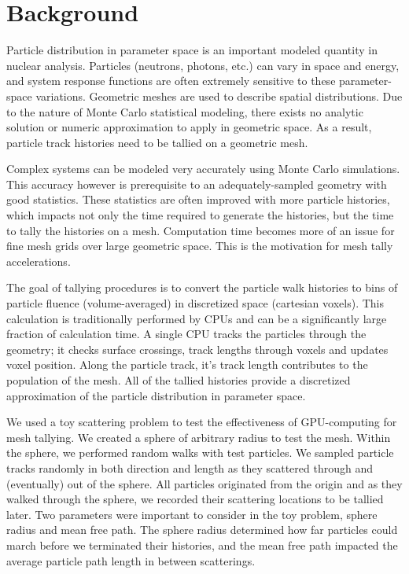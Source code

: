 
\section{Background}
Particle distribution in parameter space is an important modeled quantity in
nuclear analysis. Particles (neutrons, photons, etc.) can vary in space and
energy, and system response functions are often extremely sensitive to these
parameter-space variations. Geometric meshes are used to describe spatial
distributions. Due to the nature of Monte Carlo statistical modeling, there
exists no analytic solution or numeric approximation to apply in geometric
space. As a result, particle track histories need to be tallied on a geometric
mesh.

Complex systems can be modeled very accurately using Monte Carlo simulations.
This accuracy however is prerequisite to an adequately-sampled geometry
with good statistics. These statistics are often improved with more particle
histories, which impacts not only the time required to generate the histories,
but the time to tally the histories on a mesh. Computation time becomes more of
an issue for fine mesh grids over large geometric space. This is the motivation for mesh
tally accelerations.

The goal of tallying procedures is to convert the particle walk histories
to bins of particle fluence (volume-averaged) in discretized space (cartesian
voxels). This calculation is traditionally performed by CPUs and can be a
significantly large fraction of calculation time.
A single CPU tracks the particles through the
geometry; it checks surface crossings, track lengths through voxels and updates
voxel position. Along the particle track, it's track length contributes to the
population of the mesh. All of the tallied histories provide a discretized
approximation of the particle distribution in parameter space.

We used a toy scattering problem to test the effectiveness of GPU-computing for
mesh tallying. We created a sphere of arbitrary radius to test the mesh. Within
the sphere, we performed random walks with test particles. We sampled particle
tracks randomly in both direction and length as they scattered through and
(eventually) out of the sphere. All particles originated from the origin and
as they  walked through
the sphere, we recorded their scattering locations to be tallied later. Two
parameters were important to consider in the toy problem, sphere radius and mean
free path. The sphere radius determined how far particles could march before we
terminated their histories, and the mean free path impacted the average particle
path length in between scatterings.
